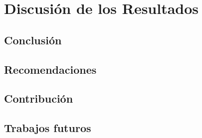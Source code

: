 \section{Discusión de los Resultados}

\subsection{Conclusión}

\subsection{Recomendaciones}

\subsection{Contribución}

\subsection{Trabajos futuros}
